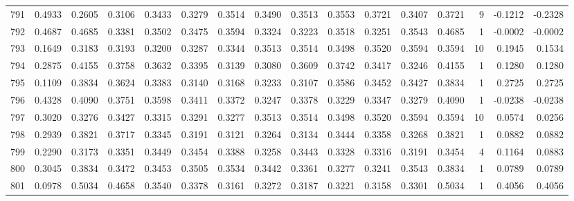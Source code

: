 \begin{tabular}{lrrrrrrrrrrrrrrr}
791 &      0.4933 &  0.2605 &  0.3106 &  0.3433 &  0.3279 &  0.3514 &  0.3490 &  0.3513 &  0.3553 &  0.3721 &   0.3407 &     0.3721 &      9 &                   -0.1212 &                    -0.2328 \\
792 &      0.4687 &  0.4685 &  0.3381 &  0.3502 &  0.3475 &  0.3594 &  0.3324 &  0.3223 &  0.3518 &  0.3251 &   0.3543 &     0.4685 &      1 &                   -0.0002 &                    -0.0002 \\
793 &      0.1649 &  0.3183 &  0.3193 &  0.3200 &  0.3287 &  0.3344 &  0.3513 &  0.3514 &  0.3498 &  0.3520 &   0.3594 &     0.3594 &     10 &                    0.1945 &                     0.1534 \\
794 &      0.2875 &  0.4155 &  0.3758 &  0.3632 &  0.3395 &  0.3139 &  0.3080 &  0.3609 &  0.3742 &  0.3417 &   0.3246 &     0.4155 &      1 &                    0.1280 &                     0.1280 \\
795 &      0.1109 &  0.3834 &  0.3624 &  0.3383 &  0.3140 &  0.3168 &  0.3233 &  0.3107 &  0.3586 &  0.3452 &   0.3427 &     0.3834 &      1 &                    0.2725 &                     0.2725 \\
796 &      0.4328 &  0.4090 &  0.3751 &  0.3598 &  0.3411 &  0.3372 &  0.3247 &  0.3378 &  0.3229 &  0.3347 &   0.3279 &     0.4090 &      1 &                   -0.0238 &                    -0.0238 \\
797 &      0.3020 &  0.3276 &  0.3427 &  0.3315 &  0.3291 &  0.3277 &  0.3513 &  0.3514 &  0.3498 &  0.3520 &   0.3594 &     0.3594 &     10 &                    0.0574 &                     0.0256 \\
798 &      0.2939 &  0.3821 &  0.3717 &  0.3345 &  0.3191 &  0.3121 &  0.3264 &  0.3134 &  0.3444 &  0.3358 &   0.3268 &     0.3821 &      1 &                    0.0882 &                     0.0882 \\
799 &      0.2290 &  0.3173 &  0.3351 &  0.3449 &  0.3454 &  0.3388 &  0.3258 &  0.3443 &  0.3328 &  0.3316 &   0.3191 &     0.3454 &      4 &                    0.1164 &                     0.0883 \\
800 &      0.3045 &  0.3834 &  0.3472 &  0.3453 &  0.3505 &  0.3534 &  0.3442 &  0.3361 &  0.3277 &  0.3241 &   0.3543 &     0.3834 &      1 &                    0.0789 &                     0.0789 \\
801 &      0.0978 &  0.5034 &  0.4658 &  0.3540 &  0.3378 &  0.3161 &  0.3272 &  0.3187 &  0.3221 &  0.3158 &   0.3301 &     0.5034 &      1 &                    0.4056 &                     0.4056 \\

\end{tabular}
